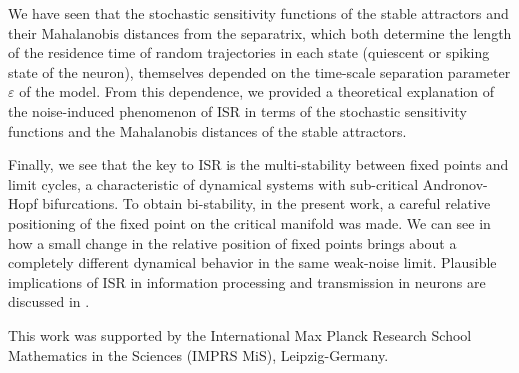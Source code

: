 We have seen that the stochastic sensitivity functions of the stable 
attractors and their Mahalanobis distances from the separatrix, which both
determine the length of the residence time of random trajectories in each 
state (quiescent or spiking state of the neuron),
themselves depended  on the time-scale 
separation parameter $\varepsilon$ of the model. 
From this dependence, we provided a theoretical 
explanation of the noise-induced phenomenon of ISR in
terms of the stochastic sensitivity functions and
the Mahalanobis distances of the stable attractors. 

Finally, we see that the key to ISR is the multi-stability between 
fixed points and limit cycles, a characteristic of dynamical systems with sub-critical
Andronov-Hopf bifurcations. To obtain bi-stability, in the present work, a careful relative 
positioning of the fixed point on the critical manifold was made. 
We can see in \cite{Yamakou1} how a small change in the relative position of fixed points
brings about a completely different dynamical behavior 
in the same weak-noise limit. Plausible implications of ISR in information processing
and transmission in neurons are discussed in \cite{Buchin}. 
\begin{acknowledgements}
This work was supported by the International Max Planck Research School 
Mathematics in the Sciences (IMPRS MiS),
Leipzig-Germany.
\end{acknowledgements}
